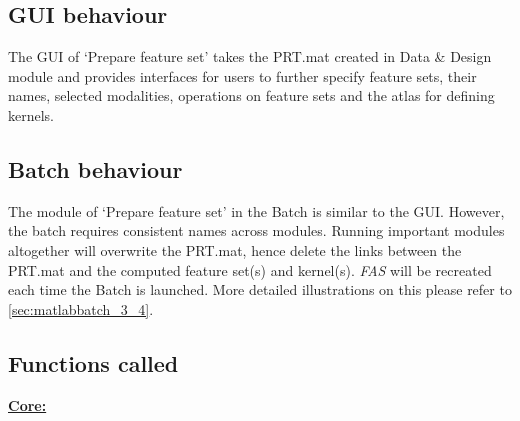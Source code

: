 
\subsection{GUI behaviour}

The GUI of `Prepare feature set' takes the PRT.mat created in Data \& Design module and provides interfaces for users to further specify feature sets, their names, selected modalities, operations on feature sets and the atlas for defining kernels. 



\subsection{Batch behaviour}

The module of `Prepare feature set' in the Batch is similar to the GUI. However, the batch requires consistent names across modules. Running important modules altogether will overwrite the PRT.mat, hence delete the links between the PRT.mat and the computed feature set(s) and kernel(s). \textit{FAS} will be recreated each time the Batch is launched. More detailed illustrations on this please refer to \ref{sec:matlabbatch_3_4}.



\subsection{Functions called}

\textbf{\underline{Core:}}

